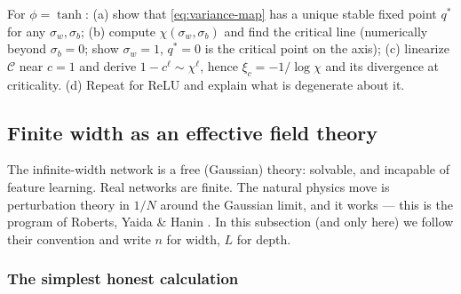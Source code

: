 \documentclass[11pt]{article}
\begin{document}
\begin{exercise}
\label{ex:edge-of-chaos}
For $\phi = \tanh$: (a) show that \cref{eq:variance-map} has a unique
stable fixed point $q^*$ for any $\sigma_w, \sigma_b$; (b) compute
$\chi(\sigma_w, \sigma_b)$ and find the critical line (numerically beyond
$\sigma_b = 0$; show $\sigma_w = 1$, $q^* = 0$ is the critical point on the
axis); (c) linearize $\mathcal{C}$ near $c = 1$ and derive
$1 - c^{\ell} \sim \chi^{\ell}$, hence $\xi_c = -1/\log\chi$ and its
divergence at criticality. (d) Repeat for ReLU and explain what is
degenerate about it. 
\end{exercise}

\subsection{Finite width as an effective field theory}
\label{sec:eft}

The infinite-width network is a free (Gaussian) theory: solvable, and
incapable of feature learning. Real networks are finite. The natural physics
move is perturbation theory in $1/N$ around the Gaussian limit, and it works
--- this is the program of Roberts, Yaida \& Hanin
\cite{roberts2022principles}. In this subsection (and only here) we follow
their convention and write $n$ for width, $L$ for depth.

\subsubsection{The simplest honest calculation}
\end{document}
